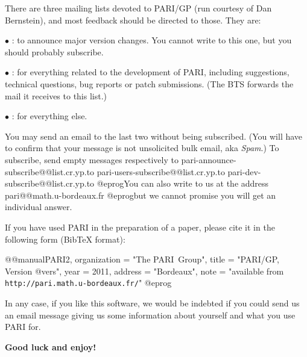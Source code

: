 There are three mailing lists devoted to PARI/GP (run courtesy of Dan
Bernstein), and most feedback should be directed to those. They are:

$\bullet$ : to announce major version changes.
You cannot write to this one, but you should probably subscribe.

$\bullet$ : for everything related to the development
of PARI, including suggestions, technical questions, bug reports or patch
submissions. (The BTS forwards the mail it receives to this list.)

 $\bullet$ : for everything else.

\noindent You may send an email to the last two without being subscribed.
(You will have to confirm that your message is not unsolicited bulk email,
aka \emph{Spam}.) To subscribe, send empty messages respectively to
\def\@{@}
\bprog
  pari-announce-subscribe@@list.cr.yp.to
     pari-users-subscribe@@list.cr.yp.to
       pari-dev-subscribe@@list.cr.yp.to
@eprog\noindent You can also write to us at the address
\bprog
  pari@@math.u-bordeaux.fr
@eprog\noindent but we cannot promise you will get an individual answer.
\smallskip

If you have used PARI in the preparation of a paper, please cite it in the
following form (BibTeX format):

\bprog
@@manual{PARI2,
    organization = "{The PARI~Group}",
    title        = "{PARI/GP, Version @vers}",
    year         = 2011,
    address      = "Bordeaux",
    note         = "available from {\tt http://pari.math.u-bordeaux.fr/}"
}
@eprog
\smallskip

\noindent In any case, if you like this software, we would be indebted if you
could send us an email message giving us some information about yourself and
what you use PARI for.

\medskip
{\bf Good luck and enjoy!}
\vfill\eject
